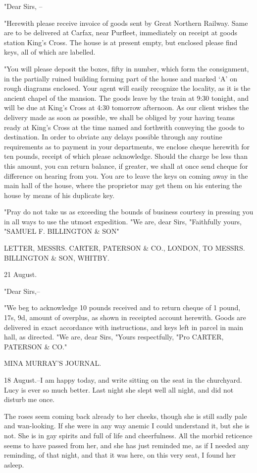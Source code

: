 "Dear Sirs, -- 

"Herewith please receive invoice of goods sent by Great Northern Railway. Same are to be delivered at Carfax, near Purfleet, immediately on receipt at goods station King's Cross. The house is at present empty, but enclosed please find keys, all of which are labelled. 

"You will please deposit the boxes, fifty in number, which form the consignment, in the partially ruined building forming part of the house and marked `A' on rough diagrams enclosed. Your agent will easily recognize the locality, as it is the ancient chapel of the mansion. The goods leave by the train at 9:30 tonight, and will be due at King's Cross at 4:30 tomorrow afternoon. As our client wishes the delivery made as soon as possible, we shall be obliged by your having teams ready at King's Cross at the time named and forthwith conveying the goods to destination. In order to obviate any delays possible through any routine requirements as to payment in your departments, we enclose cheque herewith for ten pounds, receipt of which please acknowledge. Should the charge be less than this amount, you can return balance, if greater, we shall at once send cheque for difference on hearing from you. You are to leave the keys on coming away in the main hall of the house, where the proprietor may get them on his entering the house by means of his duplicate key. 

"Pray do not take us as exceeding the bounds of business courtesy in pressing you in all ways to use the utmost expedition. "We are, dear Sirs, "Faithfully yours, "SAMUEL F. BILLINGTON \& SON" 

LETTER, MESSRS. CARTER, PATERSON \& CO., LONDON, TO MESSRS. BILLINGTON \& SON, WHITBY. 

21 August. 

"Dear Sirs,-- 

"We beg to acknowledge 10 pounds received and to return cheque of 1 pound, 17s, 9d, amount of overplus, as shown in receipted account herewith. Goods are delivered in exact accordance with instructions, and keys left in parcel in main hall, as directed. "We are, dear Sirs, "Yours respectfully, "Pro CARTER, PATERSON \& CO." 

MINA MURRAY'S JOURNAL. 

18 August.--I am happy today, and write sitting on the seat in the churchyard. Lucy is ever so much better. Last night she slept well all night, and did not disturb me once. 

The roses seem coming back already to her cheeks, though she is still sadly pale and wan-looking. If she were in any way anemic I could understand it, but she is not. She is in gay spirits and full of life and cheerfulness. All the morbid reticence seems to have passed from her, and she has just reminded me, as if I needed any reminding, of that night, and that it was here, on this very seat, I found her asleep. 

